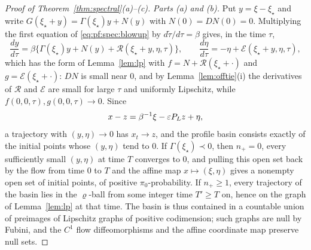 \documentclass{article} %
\makeatletter
\newif\ificlr
\newcommand{\placeblock}[1]{\ificlr\@nameuse{moved@#1}\fi}
\theoremstyle{plain}
\theoremstyle{definition}
\theoremstyle{remark}
\makeatother
\begin{document}
\thmspectral*
\placeblock{sketchspectral}
\placeblock{spectralafter}
\begin{proof}[Proof of Theorem~\ref{thm:spectral}(a)--(c)]
\emph{Parts (a) and (b).} Put $y=\xi-\xi_\star$ and write $G(\xi_\star+y)=\Gamma(\xi_\star)y+N(y)$
with $N(0)=DN(0)=0$. Multiplying the first equation of \eqref{eq:pf:spec:blowup} by
$d\tilde\tau/d\tau=\beta$ gives, in the time $\tau$,
\[
\frac{dy}{d\tau}=\beta\bigl\{\Gamma(\xi_\star)y+N(y)+\mathcal R(\xi_\star+y,\eta,\tau)\bigr\},\qquad
\frac{d\eta}{d\tau}=-\eta+\mathcal E(\xi_\star+y,\eta,\tau),
\]
which has the form of Lemma~\ref{lem:lp} with $f=N+\mathcal R(\xi_\star+\cdot)$ and
$g=\mathcal E(\xi_\star+\cdot)$: $DN$ is small near $0$, and by Lemma~\ref{lem:offtie}(i) the
derivatives of $\mathcal R$ and $\mathcal E$ are small for large $\tau$ and uniformly Lipschitz,
while $f(0,0,\tau),g(0,0,\tau)\to0$. Since
\[
x-z=\beta^{-1}\xi-\varepsilon P_Lz+\eta,
\]
a trajectory with $(y,\eta)\to0$ has $x_t\to z$, and the profile basin consists exactly of the
initial points whose $(y,\eta)$ tend to $0$. If $\Gamma(\xi_\star)\prec0$, then $n_+=0$, every
sufficiently small $(y,\eta)$ at time $T$ converges to $0$, and pulling this open set back by the
flow from time $0$ to $T$ and the affine map $x\mapsto(\xi,\eta)$ gives a nonempty open set of
initial points, of positive $\pi_0$-probability. If $n_+\ge1$, every trajectory of the basin lies
in the $\varrho$-ball from some integer time $T'\ge T$ on, hence on the graph of
Lemma~\ref{lem:lp} at that time. The basin is thus contained in a countable union of preimages of
Lipschitz graphs of positive codimension; such graphs are null by Fubini, and the $C^1$ flow diffeomorphisms and
the affine coordinate map preserve null sets.


\end{proof}
\end{document}
